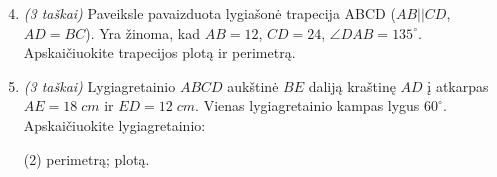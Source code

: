 \documentclass[a4paper]{article}
\begin{document}
\begin{minipage}{0.5\textwidth}
      \begin{enumerate}
            \setcounter{enumi}{3} %
            \item \textit{(3 taškai)} Paveiksle pavaizduota lygiašonė trapecija
                  ABCD
                  ($AB||CD$, $AD = BC$). Yra žinoma, kad $AB =
                        12$,
                  $CD = 24$,
                  $\angle DAB = 135^\circ$. Apskaičiuokite trapecijos plotą ir
                  perimetrą.

      \end{enumerate}
\end{minipage}

\begin{enumerate}
      \setcounter{enumi}{4} %
      \item \textit{(3 taškai)} Lygiagretainio $ABCD$ aukštinė $BE$ daliją
            kraštinę $AD$ į atkarpas $AE = 18\;cm$ ir $ED = 12\;cm$. Vienas
            lygiagretainio kampas lygus $60^\circ$. Apskaičiuokite
            lygiagretainio:

            \begin{tasks}[item-format={\normalfont}, after-item-skip=2mm](2)
                  \task perimetrą;
                  \task plotą.
            \end{tasks}
\end{enumerate}
\end{document}

